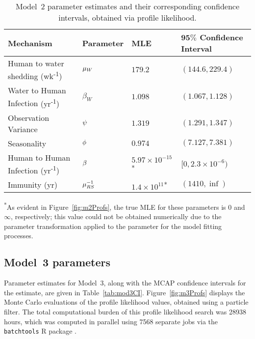 \begin{table}[!h]
\centering
\caption[Model~2 parameter estimates and confidence intervals.]{\label{tab:mod2CI}Model~2 parameter estimates and their corresponding confidence intervals, obtained via profile likelihood.}
\vspace{2mm}
\begin{tabular}{|L{3.25cm}|C{2.1cm}|C{1.9cm}|C{4.2cm}|}
\hline
\centering \textbf{Mechanism} & \textbf{Parameter} & \textbf{MLE} & $\bm{95\%}$ \textbf{Confidence Interval} \\
\hline
\hline

 Human to water shedding {\small (wk\textsuperscript{-1})} & $\mu_W$ & $179.2$
   &
  $(144.6, 229.4)$
\\
\hline

 Water to Human Infection {\small (yr\textsuperscript{-1})} & $\beta_W$ & $1.098$
   &
  $(1.067, 1.128)$
\\
\hline

 Observation Variance & $\psi$ & $1.319$
   &
  $(1.291, 1.347)$
\\
\hline

 Seasonality & $\phi$ & $0.974$
   &
  $(7.127, 7.381)$
\\
\hline

Human to Human Infection {\small (yr\textsuperscript{-1})} & $\beta$ & $\ensuremath{5.97\times 10^{-15}}$\textsuperscript{*}
   &
  $[0, \ensuremath{2.3\times 10^{-6}})$
\\
\hline

Immunity {\small (yr)} & $\mu_{RS}^{-1}$ & $\ensuremath{1.4\times 10^{11}}$\textsuperscript{*}
   &
  $(1410, \inf)$
\\
\hline

\end{tabular}
\begin{flushleft}
\textsuperscript{*}As evident in Figure~\ref{fig:m2Profs}, the true MLE for these parameters is $0$ and $\infty$, respectively; this value could not be obtained numerically due to the parameter transformation applied to the parameter for the model fitting processes.
\end{flushleft}
\end{table}

\subsection{Model~3 parameters}

Parameter estimates for Model~3, along with the MCAP confidence intervals for the estimate, are given in Table~\ref{tab:mod3CI}.
Figure~\ref{fig:m3Profs} displays the Monte Carlo evaluations of the profile likelihood values, obtained using a particle filter.
The total computational burden of this profile likelihood search was 28938 hours, which was computed in parallel using 7568 separate jobs via the \texttt{batchtools} R package \cite{batchtools}.





